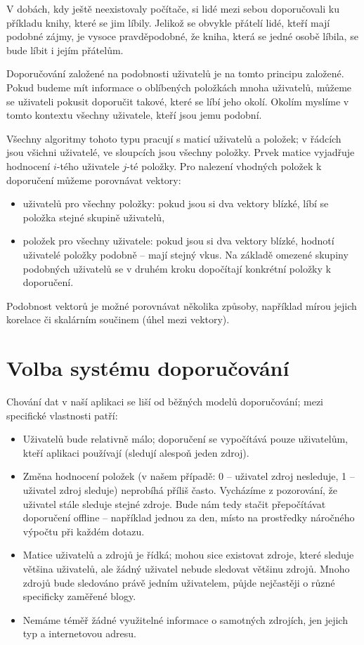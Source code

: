 V dobách, kdy ještě neexistovaly počítače, si lidé mezi sebou doporučovali ku příkladu knihy, které se jim líbily.
Jelikož se obvykle přátelí lidé, kteří mají podobné zájmy, je vysoce pravděpodobné, že kniha, která se jedné osobě líbila, se bude líbit i jejím přátelům.

Doporučování založené na podobnosti uživatelů je na tomto principu založené.
Pokud budeme mít informace o oblíbených položkách mnoha uživatelů, můžeme se uživateli pokusit doporučit takové, které se líbí jeho okolí.
Okolím myslíme v tomto kontextu všechny uživatele, kteří jsou jemu podobní.

Všechny algoritmy tohoto typu pracují s maticí uživatelů a položek; v řádcích jsou všichni uživatelé, ve sloupcích jsou všechny položky.
Prvek matice vyjadřuje hodnocení $i$-tého uživatele $j$-té položky.
Pro nalezení vhodných položek k doporučení můžeme porovnávat vektory:
\begin{itemize}
    \item uživatelů pro všechny položky: pokud jsou si dva vektory blízké, líbí se položka stejné skupině uživatelů,
    \item položek pro všechny uživatele: pokud jsou si dva vektory blízké, hodnotí uživatelé položky podobně -- mají stejný vkus.
        Na základě omezené skupiny podobných uživatelů se v druhém kroku dopočítají konkrétní položky k doporučení.
\end{itemize}

Podobnost vektorů je možné porovnávat několika způsoby, například mírou jejich korelace či skalárním součinem (úhel mezi vektory).

\section{Volba systému doporučování}

Chování dat v naší aplikaci se liší od běžných modelů doporučování; mezi specifické vlastnosti patří:

\begin{itemize}
    \item Uživatelů bude relativně málo; doporučení se vypočítává pouze uživatelům, kteří aplikaci používají (sledují alespoň jeden zdroj).
    \item Změna hodnocení položek (v našem případě: 0 -- uživatel zdroj nesleduje, 1 -- uživatel zdroj sleduje) neprobíhá příliš často.
        Vycházíme z pozorování, že uživatel stále sleduje stejné zdroje.
        Bude nám tedy stačit přepočítávat doporučení offline -- například jednou za den, místo na prostředky náročného výpočtu při každém dotazu.
    \item Matice uživatelů a zdrojů je řídká; mohou sice existovat zdroje, které sleduje většina uživatelů, ale žádný uživatel nebude sledovat většinu zdrojů.
        Mnoho zdrojů bude sledováno právě jedním uživatelem, půjde nejčastěji o různé specificky zaměřené blogy.
    \item Nemáme téměř žádné využitelné informace o samotných zdrojích, jen jejich typ a internetovou adresu.
\end{itemize}

